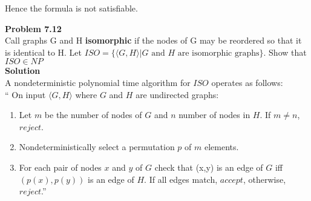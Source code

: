 \documentclass{article}
\newcommand\curl[1]{\{#1\}}
\newcommand{\problem}[1]{\large{\textbf{Problem #1}}\\}
\begin{document}
    Hence the formula is not satisfiable.

\pagebreak

\problem{7.12}
Call graphs G and H \textbf{isomorphic} if the nodes of G may be reordered so that it is identical to H. 
Let $ISO = \curl{\langle G, H \rangle | G \text{ and } H \text{ are isomorphic graphs}}$. Show that
$ISO \in NP$ \\

\textbf{Solution}\\

A nondeterministic polynomial time algorithm for $ISO$ operates as follows:\\
`` On input $\langle G, H \rangle$ where $G$ and $H$ are undirected graphs:
    \begin{enumerate}[1., leftmargin = 0.6cm]
    \itemsep0em
    \item  Let $m$ be the number of nodes of $G$ and $n$ number of nodes in $H$. If $m \ne n$, $reject$.
    \item Nondeterministically select a permutation $p$ of $m$ elements.
    \item For each pair of nodes $x$ and $y$ of $G$ check that (x,y) is an edge of $G$ iff $(p(x), p(y))$
        is an edge of $H$. If all edges match,  $accept$, otherwise, $reject$.''
    \end{enumerate}
\end{document}
